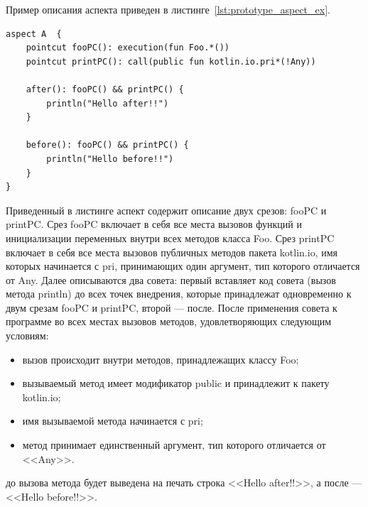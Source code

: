 \documentclass[conference]{IEEEtran}
\begin{document}
Пример описания аспекта приведен в листинге~\ref{lst:prototype_aspect_ex}.
\begin{lstlisting}[label=lst:prototype_aspect_ex,
    caption={Пример описания аспекта}]
aspect A  {
    pointcut fooPC(): execution(fun Foo.*())
    pointcut printPC(): call(public fun kotlin.io.pri*(!Any))

    after(): fooPC() && printPC() {
        println("Hello after!!")
    }

    before(): fooPC() && printPC() {
        println("Hello before!!")
    }
}
\end{lstlisting}
Приведенный в листинге аспект содержит описание двух срезов: fooPC и printPC.
Срез fooPC включает в себя все места вызовов функций и инициализации переменных
внутри всех методов класса Foo.
Срез printPC включает в себя все места вызовов публичных методов пакета
kotlin.io, имя которых начинается с pri, принимающих один аргумент, тип
которого отличается от Any.
Далее описываются два совета: первый вставляет код совета (вызов метода println) 
до всех точек внедрения, которые принадлежат одновременно к двум срезам fooPC и
printPC, второй --- после.
После применения совета к программе во всех местах вызовов методов,
удовлетворяющих следующим условиям:
\begin{itemize}
	\item вызов происходит внутри методов, принадлежащих классу Foo;
	\item вызываемый метод имеет модификатор public и принадлежит к пакету
		  kotlin.io;
	\item имя вызываемой метода начинается с pri;
	\item метод принимает единственный аргумент, тип которого отличается от
	      <<Any>>.
\end{itemize}
 до вызова метода будет выведена на печать строка <<Hello after!!>>, а после ---
<<Hello before!!>>.
\end{document}
